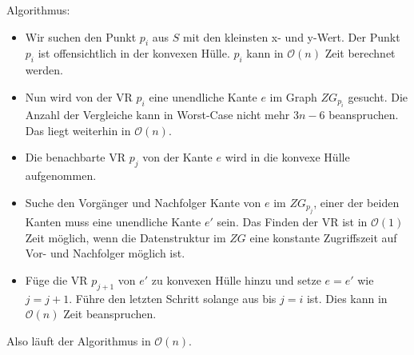 \documentclass[a4paper]{article}
\begin{document}
Algorithmus:

\begin{itemize}

\item Wir suchen den Punkt $p_i$ aus $S$ mit den kleinsten x- und y-Wert. Der Punkt $p_i$ ist offensichtlich in der konvexen Hülle. $p_i$ kann in $\mathcal{O}(n)$ Zeit berechnet werden.

\item Nun wird von der VR $p_i$ eine unendliche Kante $e$ im Graph $ZG_{p_i}$ gesucht. Die Anzahl der Vergleiche kann in Worst-Case nicht mehr $3 n-6$ beanspruchen. Das liegt weiterhin in $\mathcal{O}(n)$.

\item Die benachbarte VR $p_j$ von der Kante $e$ wird in die konvexe Hülle aufgenommen.

\item Suche den Vorgänger und Nachfolger Kante von $e$ im $ZG_{p_j}$, einer der beiden Kanten muss eine unendliche Kante $e'$ sein. Das Finden der VR ist in $\mathcal{O}(1)$ Zeit möglich, wenn die Datenstruktur im $ZG$ eine konstante Zugriffszeit auf Vor- und Nachfolger möglich ist. 

\item Füge die VR $p_{j+1}$ von $e'$ zu konvexen Hülle hinzu und setze $e = e'$ wie $j=j+1$. Führe den letzten Schritt solange aus bis $j=i$ ist. Dies kann in $\mathcal{O}(n)$ Zeit beanspruchen.

\end{itemize}

Also läuft der Algorithmus in $\mathcal{O}(n)$.
\end{document}
